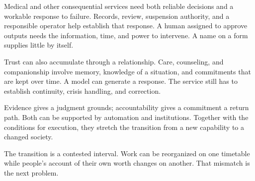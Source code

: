 Medical and other consequential services need both reliable decisions and a workable response to failure. Records, review, suspension authority, and a responsible operator help establish that response. A human assigned to approve outputs needs the information, time, and power to intervene. A name on a form supplies little by itself.

Trust can also accumulate through a relationship. Care, counseling, and companionship involve memory, knowledge of a situation, and commitments that are kept over time. A model can generate a response. The service still has to establish continuity, crisis handling, and correction.

Evidence gives a judgment grounds; accountability gives a commitment a return path. Both can be supported by automation and institutions. Together with the conditions for execution, they stretch the transition from a new capability to a changed society.

The transition is a contested interval. Work can be reorganized on one timetable while people's account of their own worth changes on another. That mismatch is the next problem.
